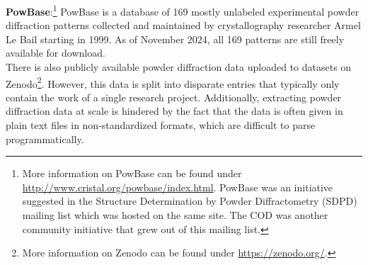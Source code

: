 \textbf{PowBase}:\footnote{More information on PowBase can be found under \url{http://www.cristal.org/powbase/index.html}. PowBase was an initiative suggested in the Structure Determination by
Powder Diffractometry (SDPD) mailing list which was hosted on the same site. The COD was another community initiative that grew out of this mailing list.} PowBase is a database of 169 mostly unlabeled experimental powder diffraction patterns collected and maintained by crystallography researcher Armel Le Bail starting in 1999. As of November 2024, all 169 patterns are still freely available for download. \\


There is also publicly available powder diffraction data uploaded to datasets on Zenodo\footnote{More information on Zenodo can be found under \url{https://zenodo.org/}.}. However, this data is split into disparate entries that typically only contain the work of a single research project. Additionally, extracting powder diffraction data at scale is hindered by the fact that the data is often given in plain text files in non-standardized formats, which are difficult to parse programmatically. \\

